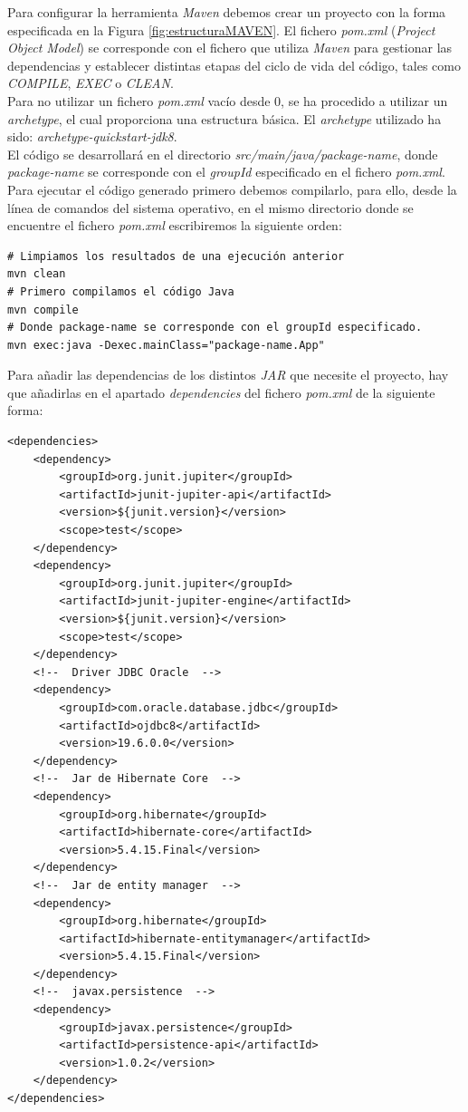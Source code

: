 \documentclass[11pt,a4paper]{article}
\begin{document}
Para configurar la herramienta \emph{Maven} debemos crear un proyecto con la forma especificada en la Figura \ref{fig:estructuraMAVEN}. El fichero \emph{pom.xml} (\emph{Project Object Model}) se corresponde con el fichero que utiliza \emph{Maven} para gestionar las dependencias y establecer distintas etapas del ciclo de vida del código, tales como \emph{COMPILE}, \emph{EXEC} o \emph{CLEAN}.\\
Para no utilizar un fichero \emph{pom.xml} vacío desde 0, se ha procedido a utilizar un \emph{archetype}, el cual proporciona una estructura básica. El \emph{archetype} utilizado ha sido: \emph{archetype-quickstart-jdk8}.\\
El código se desarrollará en el directorio \emph{src/main/java/package-name}, donde \emph{package-name} se corresponde con el \emph{groupId} especificado en el fichero \emph{pom.xml}.\\
Para ejecutar el código generado primero debemos compilarlo, para ello, desde la línea de comandos del sistema operativo, en el mismo directorio donde se encuentre el fichero \emph{pom.xml} escribiremos la siguiente orden:

\begin{lstlisting}
# Limpiamos los resultados de una ejecución anterior
mvn clean
# Primero compilamos el código Java
mvn compile
# Donde package-name se corresponde con el groupId especificado.
mvn exec:java -Dexec.mainClass="package-name.App"
\end{lstlisting}

Para añadir las dependencias de los distintos \emph{JAR} que necesite el proyecto, hay que añadirlas en el apartado \emph{dependencies} del fichero \emph{pom.xml} de la siguiente forma:

\begin{lstlisting}
<dependencies>
	<dependency>
		<groupId>org.junit.jupiter</groupId>
		<artifactId>junit-jupiter-api</artifactId>
		<version>${junit.version}</version>
		<scope>test</scope>
	</dependency>
	<dependency>
		<groupId>org.junit.jupiter</groupId>
		<artifactId>junit-jupiter-engine</artifactId>
		<version>${junit.version}</version>
		<scope>test</scope>
	</dependency>
	<!--  Driver JDBC Oracle  -->
	<dependency>
		<groupId>com.oracle.database.jdbc</groupId>
		<artifactId>ojdbc8</artifactId>
		<version>19.6.0.0</version>
	</dependency>
	<!--  Jar de Hibernate Core  -->
	<dependency>
		<groupId>org.hibernate</groupId>
		<artifactId>hibernate-core</artifactId>
		<version>5.4.15.Final</version>
	</dependency>
	<!--  Jar de entity manager  -->
	<dependency>
		<groupId>org.hibernate</groupId>
		<artifactId>hibernate-entitymanager</artifactId>
		<version>5.4.15.Final</version>
	</dependency>
	<!--  javax.persistence  -->
	<dependency>
		<groupId>javax.persistence</groupId>
		<artifactId>persistence-api</artifactId>
		<version>1.0.2</version>
	</dependency>
</dependencies>
\end{lstlisting}
\end{document}
